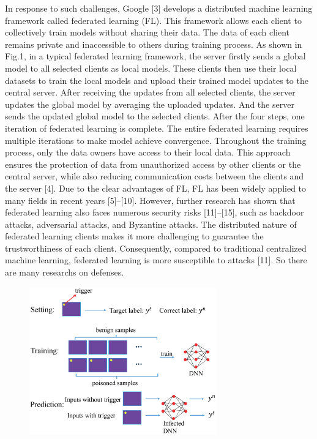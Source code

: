 In response to such challenges, Google [3] develops a
distributed machine learning framework called federated
learning (FL). This framework allows each client to collectively train models without sharing their data. The data
of each client remains private and inaccessible to others
during training process. As shown in Fig.1, in a typical federated learning framework, the server firstly sends a global
model to all selected clients as local models. These clients
then use their local datasets to train the local models and
upload their trained model updates to the central server.
After receiving the updates from all selected clients, the
server updates the global model by averaging the uploaded
updates. And the server sends the updated global model
to the selected clients. After the four steps, one iteration
of federated learning is complete. The entire federated
learning requires multiple iterations to make model achieve
convergence. Throughout the training process, only the
data owners have access to their local data. This approach
ensures the protection of data from unauthorized access
by other clients or the central server, while also reducing
communication costs between the clients and the server
[4]. Due to the clear advantages of FL, FL has been widely
applied to many fields in recent years [5]–[10]. However,
further research has shown that federated learning also
faces numerous security risks [11]–[15], such as backdoor
attacks, adversarial attacks, and Byzantine attacks. The distributed nature of federated learning clients makes it
more challenging to guarantee the trustworthiness of each
client. Consequently, compared to traditional centralized
machine learning, federated learning is more susceptible
to attacks [11]. So there are many researchs on defenses.


\begin{figure}[t]
    \centering
    \includegraphics[width=1.0\linewidth,height=2.5in]{output/fig2.eps}
     \caption{}
     \label{fig2}
\end{figure}  

